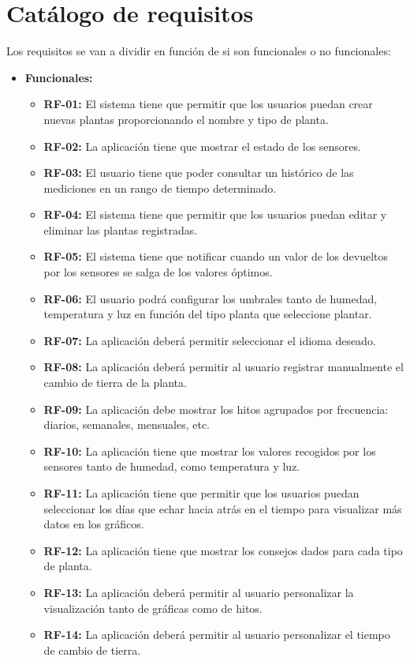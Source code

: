 \section{Catálogo de requisitos}
Los requisitos se van a dividir en función de si son funcionales o no funcionales:

\begin{itemize}
    \item \textbf{Funcionales:}
        \begin{itemize}
            \item \textbf{RF-01:} El sistema tiene que permitir que los usuarios puedan crear nuevas plantas proporcionando el nombre y tipo de planta.
            \item \textbf{RF-02:} La aplicación tiene que mostrar el estado de los sensores.
            \item \textbf{RF-03:} El usuario tiene que poder consultar un histórico de las mediciones en un rango de tiempo determinado.
            \item \textbf{RF-04:} El sistema tiene que permitir que los usuarios puedan editar y eliminar las plantas registradas.
            \item \textbf{RF-05:} El sistema tiene que notificar cuando un valor de los devueltos por los sensores se salga de los valores óptimos.
            \item \textbf{RF-06:} El usuario podrá configurar los umbrales tanto de humedad, temperatura y luz en función del tipo planta que seleccione plantar. 
            \item \textbf{RF-07:} La aplicación deberá permitir seleccionar el idioma deseado.
            \item \textbf{RF-08:} La aplicación deberá permitir al usuario registrar manualmente el cambio de tierra de la planta.
            \item \textbf{RF-09:} La aplicación debe mostrar los hitos agrupados por frecuencia: diarios, semanales, mensuales, etc.
            \item \textbf{RF-10:} La aplicación tiene que mostrar los valores recogidos por los sensores tanto de humedad, como temperatura y luz.
            \item \textbf{RF-11:} La aplicación tiene que permitir que los usuarios puedan seleccionar los días que echar hacia atrás en el tiempo para visualizar más datos en los gráficos.
            \item \textbf{RF-12:} La aplicación tiene que mostrar los consejos dados para cada tipo de planta.
            \item \textbf{RF-13:} La aplicación deberá permitir al usuario personalizar la visualización tanto de gráficas como de hitos.
            \item \textbf{RF-14:} La aplicación deberá permitir al usuario personalizar el tiempo de cambio de tierra.
            



\end{itemize}
\end{itemize}
